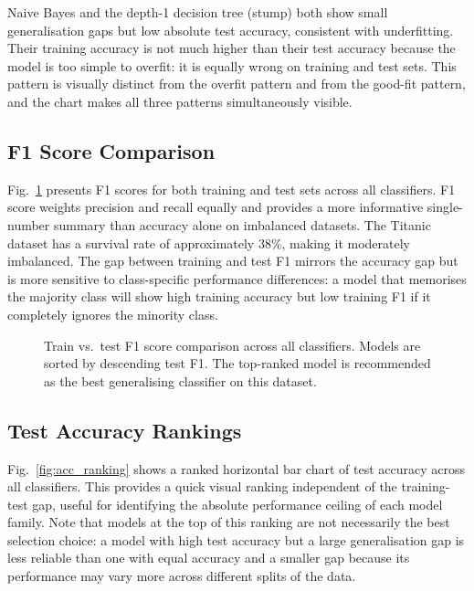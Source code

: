 \documentclass[conference]{IEEEtran}
\begin{document}
Naive Bayes and the depth-1 decision tree (stump) both show small generalisation gaps but low absolute test accuracy, consistent with underfitting. Their training accuracy is not much higher than their test accuracy because the model is too simple to overfit: it is equally wrong on training and test sets. This pattern is visually distinct from the overfit pattern and from the good-fit pattern, and the chart makes all three patterns simultaneously visible.

\subsection{F1 Score Comparison}

Fig.~\ref{fig:f1_chart} presents F1 scores for both training and test sets across all classifiers. F1 score weights precision and recall equally and provides a more informative single-number summary than accuracy alone on imbalanced datasets. The Titanic dataset has a survival rate of approximately 38\%, making it moderately imbalanced. The gap between training and test F1 mirrors the accuracy gap but is more sensitive to class-specific performance differences: a model that memorises the majority class will show high training accuracy but low training F1 if it completely ignores the minority class.

\begin{figure}[t]
    \centering
    \caption{Train vs.\ test F1 score comparison across all classifiers. Models are sorted by descending test F1. The top-ranked model is recommended as the best generalising classifier on this dataset.}
    \label{fig:f1_chart}
\end{figure}

\subsection{Test Accuracy Rankings}

Fig.~\ref{fig:acc_ranking} shows a ranked horizontal bar chart of test accuracy across all classifiers. This provides a quick visual ranking independent of the training-test gap, useful for identifying the absolute performance ceiling of each model family. Note that models at the top of this ranking are not necessarily the best selection choice: a model with high test accuracy but a large generalisation gap is less reliable than one with equal accuracy and a smaller gap because its performance may vary more across different splits of the data.
\end{document}
